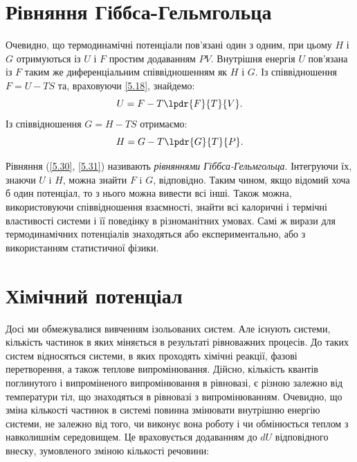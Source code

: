 \section{Рівняння Гіббса-Гельмгольца}

Очевидно, що термодинамічні потенціали пов'язані один з одним, при цьому $H$ і $G$ отримуються із $U$ і $F$ простим додаванням $PV$. Внутрішня енергія $U$ пов'язана із $F$ таким же диференціальним співвідношенням як $H$ і $G$. Із співвідношення $F=U-TS$ та, враховуючи \eqref{5.18}, знайдемо:
\begin{equation}\label{5.30}
	U = F - T\lpdr{F}{T}{V}.
\end{equation}
Із співвідношення $G=H-TS$ отримаємо:
\begin{equation}\label{5.31}
	H = G-T\lpdr{G}{T}{P}.
\end{equation}

Рівняння (\ref{5.30}, \ref{5.31}) називають \emph{рівняннями Гіббса-Гельмгольца}. Інтегруючи їх, знаючи $U$ i $H$, можна знайти $F$ i $G$, відповідно. Таким чином, якщо відомий хоча б один потенціал, то з нього можна вивести всі інші. Також можна, використовуючи співвідношення взаємності, знайти всі калоричні і термічні властивості системи і її поведінку в різноманітних умовах. Самі ж вирази для термодинамічних потенціалів знаходяться або експериментально, або з використанням статистичної фізики.

\section{Хімічний потенціал}

Досі ми обмежувалися вивченням ізольованих систем. Але існують системи, кількість частинок в яких міняється в результаті рівноважних процесів. До таких систем відносяться системи, в яких проходять хімічні реакції, фазові перетворення, а також теплове випромінювання. Дійсно, кількість квантів поглинутого і випроміненого випромінювання в рівновазі, є різною залежно від температури тіл, що знаходяться в рівновазі з випромінюванням. Очевидно, що зміна кількості частинок в системі повинна змінювати внутрішню енергію системи, не залежно від того, чи виконує вона роботу і чи обмінюється теплом з навколишнім середовищем. Це враховується додаванням до $dU$ відповідного внеску, зумовленого зміною кількості речовини:


